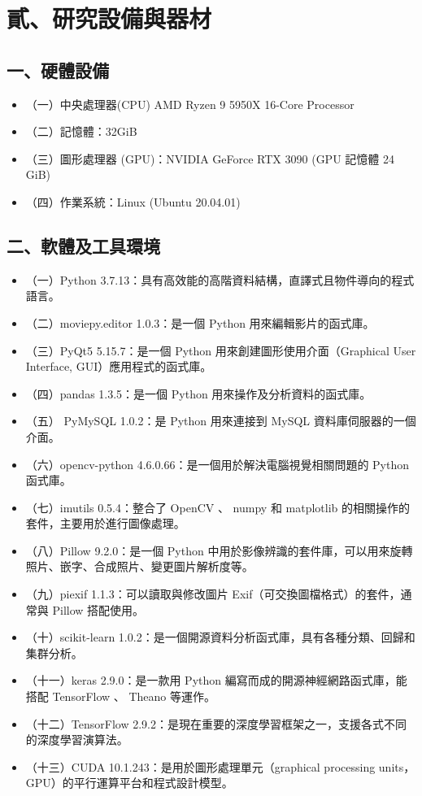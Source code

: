\section{貳、研究設備與器材}

\subsection{一、硬體設備}

\begin{itemize}
    \item []（一）中央處理器(CPU) AMD Ryzen 9 5950X 16-Core Processor
    \item []（二）記憶體：32GiB
    \item []（三）圖形處理器 (GPU)：NVIDIA GeForce RTX 3090 (GPU 記憶體 24 GiB)
    \item []（四）作業系統：Linux (Ubuntu 20.04.01)
\end{itemize}

\subsection{二、軟體及工具環境}

\begin{itemize}
    \item []（一）Python 3.7.13：具有高效能的高階資料結構，直譯式且物件導向的程式語言。
    \item []（二）moviepy.editor 1.0.3：是一個 Python 用來編輯影片的函式庫。
    \item []（三）PyQt5 5.15.7：是一個 Python 用來創建圖形使用介面（Graphical User Interface, GUI）應用程式的函式庫。
    \item []（四）pandas 1.3.5：是一個 Python 用來操作及分析資料的函式庫。
    \item []（五） PyMySQL 1.0.2：是 Python 用來連接到 MySQL 資料庫伺服器的一個介面。
    \item []（六）opencv-python 4.6.0.66：是一個用於解決電腦視覺相關問題的 Python 函式庫。
    \item []（七）imutils 0.5.4：整合了 OpenCV 、 numpy 和 matplotlib 的相關操作的套件，主要用於進行圖像處理。
    \item []（八）Pillow 9.2.0：是一個 Python 中用於影像辨識的套件庫，可以用來旋轉照片、嵌字、合成照片、變更圖片解析度等。
    \item []（九）piexif 1.1.3：可以讀取與修改圖片 Exif（可交換圖檔格式）的套件，通常與 Pillow 搭配使用。
    \item []（十）scikit-learn 1.0.2：是一個開源資料分析函式庫，具有各種分類、回歸和集群分析。
    \item []（十一）keras 2.9.0：是一款用 Python 編寫而成的開源神經網路函式庫，能搭配 TensorFlow 、 Theano 等運作。
    \item []（十二）TensorFlow 2.9.2：是現在重要的深度學習框架之一，支援各式不同的深度學習演算法。
    \item []（十三）CUDA 10.1.243：是用於圖形處理單元（graphical processing units，GPU）的平行運算平台和程式設計模型。
\end{itemize}

